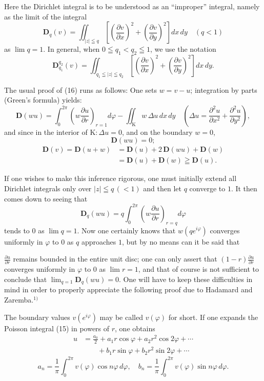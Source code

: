 \documentclass{article}
\begin{document}
Here the Dirichlet integral is to be understood as an ``improper'' integral, namely as the limit of the integral
\[ \mathbf{D}_q(v) = \iint_{|z| \leqq q} \left[ \left(\frac{\partial v}{\partial x}\right)^2 + \left(\frac{\partial v}{\partial y}\right)^2 \right] dx\,dy \quad (q < 1) \]
as $\lim q = 1$. In general, when $0 \leqq q_1 < q_2 \leqq 1$, we use the notation
\[ \mathbf{D}_{q_1}^{q_2}(v) = \iint_{q_1 \leqq |z| \leqq q_2} \left[ \left(\frac{\partial v}{\partial x}\right)^2 + \left(\frac{\partial v}{\partial y}\right)^2 \right] dx\,dy. \]

The usual proof of (16) runs as follows: One sets $w = v - u$; integration by parts (Green's formula) yields:
\[ \mathbf{D}(wu) = \int_0^{2\pi} \left( w \frac{\partial u}{\partial r} \right)_{r=1} d\varphi - \iint_{\mathrm{K}} w\,\Delta u\,dx\,dy \quad \left( \Delta u = \frac{\partial^2 u}{\partial x^2} + \frac{\partial^2 u}{\partial y^2} \right), \]
and since in the interior of $\mathrm{K}\colon \Delta u = 0$, and on the boundary $w = 0$,
\[ \mathbf{D}(wu) = 0; \]
\[ \begin{aligned}
\mathbf{D}(v) = \mathbf{D}(u + w) &= \mathbf{D}(u) + 2\,\mathbf{D}(wu) + \mathbf{D}(w) \\
&= \mathbf{D}(u) + \mathbf{D}(w) \geqq \mathbf{D}(u).
\end{aligned} \]

If one wishes to make this inference rigorous, one must initially extend all Dirichlet integrals only over $|z| \leqq q\,(< 1)$ and then let $q$ converge to $1$. It then comes down to seeing that
\[ \mathbf{D}_q(wu) = q \int_0^{2\pi} \left( w \frac{\partial u}{\partial r} \right)_{r=q} d\varphi \]
tends to $0$ as $\lim q = 1$. Now one certainly knows that $w(q e^{i\varphi})$ converges uniformly in $\varphi$ to $0$ as $q$ approaches $1$, but by no means can it be said that

$\frac{\partial u}{\partial r}$ remains bounded in the entire unit disc; one can only assert that $(1 - r) \frac{\partial u}{\partial r}$ converges uniformly in $\varphi$ to $0$ as $\lim r = 1$, and that of course is not sufficient to conclude that $\lim_{q=1} \mathbf{D}_q(wu) = 0$. One will have to keep these difficulties in mind in order to properly appreciate the following proof due to Hadamard and Zaremba.${}^{1)}$

The boundary values $v(e^{i\varphi})$ may be called $v(\varphi)$ for short. If one expands the Poisson integral (15) in powers of $r$, one obtains
\[ \begin{aligned}
u &= \frac{a_0}{2} + a_1 r \cos\varphi + a_2 r^2 \cos 2\varphi + \cdots \\
&\qquad + b_1 r \sin\varphi + b_2 r^2 \sin 2\varphi + \cdots
\end{aligned} \]
\[ a_n = \frac{1}{\pi} \int_0^{2\pi} v(\varphi) \cos n\varphi\,d\varphi, \quad b_n = \frac{1}{\pi} \int_0^{2\pi} v(\varphi) \sin n\varphi\,d\varphi. \]
\end{document}
